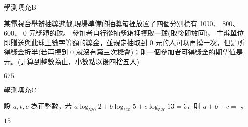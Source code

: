     \begin{QUESTION}
        \begin{ExamInfo}{93}{學測}{填充}{B}
        \end{ExamInfo}
        \begin{ExamAnsRateInfo}{25}{57}{16}{2}
        \end{ExamAnsRateInfo}
        \begin{QBODY}
            某電視台舉辦抽獎遊戲,現場準備的抽獎箱裡放置了四個分別標有 1000、 800、 600、 0 元獎額的球。
            參加者自行從抽獎箱裡摸取一球(取後即放回)，
            主辦單位即贈送與此球上數字等額的獎金，並規定抽取到 0 元的人可以再摸一次，但是所得獎金折半(若再摸到 0 就沒有第三次機會)；則一個參加者可得獎金的期望值是 
            \TCNBOX{\TCN\TCN\TCN} 元。(計算到整數為止，小數點以後四捨五入)
        \end{QBODY}
        \begin{QFROMS}
        \end{QFROMS}
        \begin{QTAGS}\end{QTAGS}
        \begin{QANS}
            $675$
        \end{QANS}
        \begin{QSOLLIST}
        \end{QSOLLIST}
        \begin{QEMPTYSPACE}
        \end{QEMPTYSPACE}
    \end{QUESTION}
    \begin{QUESTION}
        \begin{ExamInfo}{93}{學測}{填充}{C}
        \end{ExamInfo}
        \begin{ExamAnsRateInfo}{36}{77}{27}{4}
        \end{ExamAnsRateInfo}
        \begin{QBODY}
            設 $a,b,c$ 為正整數，若 $a\log_{520} 2+b\log_{520} 5+c\log_{520}13=3$，則 $a+b+c=$ 
            \TCNBOX{} 。
        \end{QBODY}
        \begin{QFROMS}
        \end{QFROMS}
        \begin{QTAGS}\end{QTAGS}
        \begin{QANS}
            $15$
        \end{QANS}
        \begin{QSOLLIST}
        \end{QSOLLIST}
        \begin{QEMPTYSPACE}
        \end{QEMPTYSPACE}
    \end{QUESTION}
